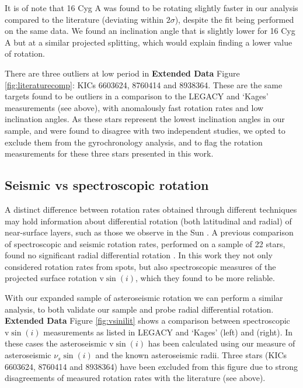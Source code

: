 It is of note that 16 Cyg A was found to be rotating slightly faster in our analysis compared to the literature \cite{davies+2015} (deviating within $2\sigma$), despite the fit being performed on the same data. We found an inclination angle that is slightly lower for 16 Cyg A but at a similar projected splitting, which would explain finding a lower value of rotation.

There are three outliers at low period in  \textbf{Extended Data} Figure \ref{fig:literaturecomp}: KICs 6603624, 8760414 and 8938364. These are the same targets found to be outliers in a comparison to the LEGACY and `Kages' measurements (see above), with anomalously fast rotation rates and low inclination angles. As these stars represent the lowest inclination angles in our sample, and were found to disagree with two independent studies, we opted to exclude them from the gyrochronology analysis, and to flag the rotation measurements for these three stars presented in this work.

\subsection{Seismic vs spectroscopic rotation}
A distinct difference between rotation rates obtained through different techniques may hold information about differential rotation (both latitudinal and radial) of near-surface layers, such as those we observe in the Sun \cite{beck2000}.  A previous comparison of spectroscopic and seismic rotation rates, performed on a sample of 22 stars, found no significant radial differential rotation \cite{benomar+2018}. In this work they not only considered rotation rates from spots, but also spectroscopic measures of the projected surface rotation $\textrm{v}\sin(i)$, which they found to be more reliable.

With our expanded sample of asteroseismic rotation we can perform a similar analysis, to both validate our sample and probe radial differential rotation.  \textbf{Extended Data} Figure \ref{fig:vsinilit} shows a comparison between spectroscopic $\textrm{v}\sin(i)$ measurements as listed in LEGACY and `Kages' (left) and \cite{benomar+2015} (right). In these cases the asteroseismic $\textrm{v}\sin(i)$ has been calculated using our measure of asteroseismic $\nu_s\sin(i)$ and the known asteroseismic radii. Three stars (KICs 6603624, 8760414 and 8938364) have been excluded from this figure due to strong disagreements of measured rotation rates with the literature (see above).

